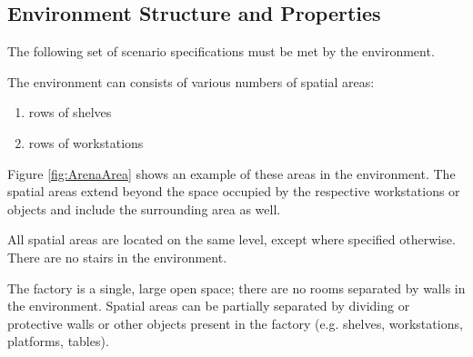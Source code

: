 
\subsection{Environment Structure and Properties}
\label{ssec:StructureProperties}

\noindent
The following set of scenario specifications must be met by the \erlir environment.
\begin{envSpec}
The environment can consists of various numbers of spatial areas:
	\begin{enumerate}
	\renewcommand{\itemsep}{0.1ex}
	\item rows of shelves
	\item rows of workstations
	\end{enumerate}
	Figure \ref{fig:ArenaArea} shows an example of these areas in the \erlir environment.
The spatial areas extend beyond the space occupied by the respective workstations or objects and include the surrounding area as well. 
\end{envSpec}

\begin{envSpec}
	All spatial areas are located on the same level, except where 
	specified otherwise. There are no stairs in the environment.
\end{envSpec}

\begin{envSpec}
The factory is a single, large open space; there are no rooms separated by walls in the environment. 
Spatial areas can be partially separated by dividing or protective walls or other objects present in the factory (e.g. shelves, workstations, platforms, tables).
\end{envSpec}


